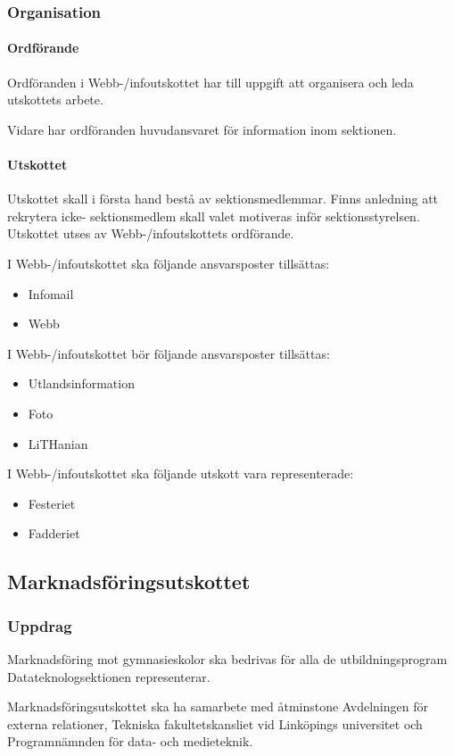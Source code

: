 \documentclass{datateknologsektionen-document}
\begin{document}
\subsubsection{Organisation}
\paragraph{Ordförande}
Ordföranden i Webb-/infoutskottet har till uppgift att organisera och leda utskottets arbete.

Vidare har ordföranden huvudansvaret för information inom sektionen.
\paragraph{Utskottet}

Utskottet skall i första hand bestå av sektionsmedlemmar. Finns anledning att rekrytera icke-
sektionsmedlem skall valet motiveras inför sektionsstyrelsen. Utskottet utses av Webb-/infoutskottets ordförande.

I Webb-/infoutskottet ska följande ansvarsposter tillsättas:
\begin{itemize}
  \item Infomail
  \item Webb
\end{itemize}
I Webb-/infoutskottet bör följande ansvarsposter tillsättas:
\begin{itemize}
  \item Utlandsinformation
  \item Foto
  \item LiTHanian
\end{itemize}
I Webb-/infoutskottet ska följande utskott vara representerade:
\begin{itemize}
  \item Festeriet
  \item Fadderiet
\end{itemize}

\subsection{Marknadsföringsutskottet}
\label{mafu}
\subsubsection{Uppdrag}
Marknadsföring mot gymnasieskolor ska bedrivas för alla de utbildningsprogram
Datateknologsektionen representerar.

Marknadsföringsutskottet ska ha samarbete med åtminstone Avdelningen för externa relationer,
Tekniska fakultetskansliet vid Linköpings universitet och Programnämnden för data- och
medieteknik.
\end{document}
